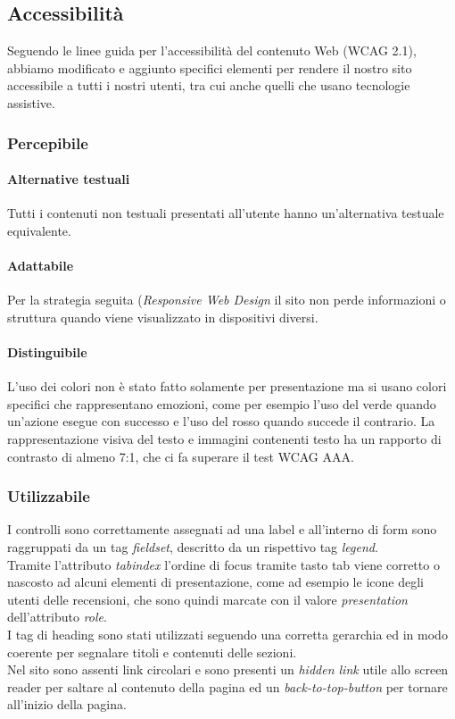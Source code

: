 \newpage
\subsection{Accessibilità}
Seguendo le linee guida per l'accessibilità del contenuto Web (WCAG 2.1), abbiamo modificato e aggiunto specifici elementi per rendere il nostro sito accessibile a tutti i nostri utenti, tra cui anche quelli che usano tecnologie assistive.   
\subsubsection{Percepibile}
\paragraph{Alternative testuali}
Tutti i contenuti non testuali presentati all'utente hanno un'alternativa testuale equivalente.
\paragraph{Adattabile}
Per la strategia seguita (\textit{Responsive Web Design} il sito non perde informazioni o struttura quando viene visualizzato in dispositivi diversi.
\paragraph{Distinguibile}
L'uso dei colori non è stato fatto solamente per presentazione ma si usano colori specifici che rappresentano emozioni, come per esempio l'uso del verde quando un'azione esegue con successo e l'uso del rosso quando succede il contrario.
La rappresentazione visiva del testo e immagini contenenti testo ha un rapporto di contrasto di almeno 7:1, che ci fa superare il test WCAG AAA.
\subsubsection{Utilizzabile}
I controlli sono correttamente assegnati ad una label e all'interno di form sono raggruppati da un tag \textit{fieldset}, descritto da un rispettivo tag \textit{legend}.\\
Tramite l'attributo \textit{tabindex} l'ordine di focus tramite tasto tab viene corretto o nascosto ad alcuni elementi di presentazione, come ad esempio le icone degli utenti delle recensioni, che sono quindi marcate con il valore \textit{presentation} dell'attributo \textit{role}.\\
I tag di heading sono stati utilizzati seguendo una corretta gerarchia ed in modo coerente per segnalare titoli e contenuti delle sezioni.\\
Nel sito sono assenti link circolari e sono presenti un \textit{hidden link} utile allo screen reader per saltare al contenuto della pagina ed un \textit{back-to-top-button} per tornare all'inizio della pagina.\\
